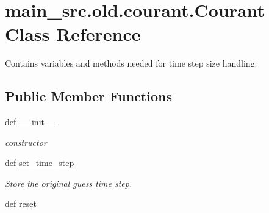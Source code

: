 \hypertarget{classmain__src_8old_1_1courant_1_1Courant}{\section{main\-\_\-src.\-old.\-courant.\-Courant Class Reference}
\label{classmain__src_8old_1_1courant_1_1Courant}
}


Contains variables and methods needed for time step size handling.  


\subsection*{Public Member Functions}
\begin{DoxyCompactItemize}
\item 
\hypertarget{classmain__src_8old_1_1courant_1_1Courant_a5f750343263f79e8635f0b1e7b33938b}{def \hyperlink{classmain__src_8old_1_1courant_1_1Courant_a5f750343263f79e8635f0b1e7b33938b}{\-\_\-\-\_\-init\-\_\-\-\_\-}}\label{classmain__src_8old_1_1courant_1_1Courant_a5f750343263f79e8635f0b1e7b33938b}

\begin{DoxyCompactList}\small\item\em constructor \end{DoxyCompactList}\item 
\hypertarget{classmain__src_8old_1_1courant_1_1Courant_a07477ef2b1ff3e65631f34f553e111f7}{def \hyperlink{classmain__src_8old_1_1courant_1_1Courant_a07477ef2b1ff3e65631f34f553e111f7}{set\-\_\-time\-\_\-step}}\label{classmain__src_8old_1_1courant_1_1Courant_a07477ef2b1ff3e65631f34f553e111f7}

\begin{DoxyCompactList}\small\item\em Store the original guess time step. \end{DoxyCompactList}\item 
\hypertarget{classmain__src_8old_1_1courant_1_1Courant_a45c40308ebd673cd4963bf082979dcb0}{def \hyperlink{classmain__src_8old_1_1courant_1_1Courant_a45c40308ebd673cd4963bf082979dcb0}{reset}}\label{classmain__src_8old_1_1courant_1_1Courant_a45c40308ebd673cd4963bf082979dcb0}


\end{DoxyCompactItemize}
